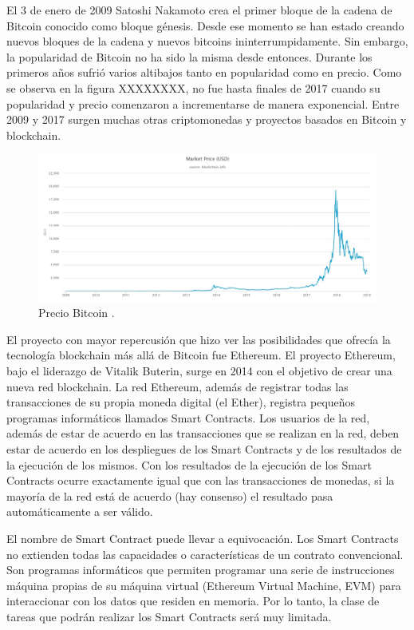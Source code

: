 El 3 de enero de 2009 Satoshi Nakamoto crea el primer bloque de la cadena de Bitcoin conocido como bloque génesis. Desde ese momento se han estado creando nuevos bloques de la cadena y nuevos bitcoins ininterrumpidamente. Sin embargo, la popularidad de Bitcoin no ha sido la misma desde entonces. Durante los primeros años sufrió varios altibajos tanto en popularidad como en precio. Como se observa en la figura XXXXXXXX, no fue hasta finales de 2017 cuando su popularidad y precio comenzaron a incrementarse de manera exponencial. Entre 2009 y 2017 surgen muchas otras criptomonedas y proyectos basados en Bitcoin y blockchain.\newline

\begin{figure}
	\centering
	\includegraphics[width=1\textwidth]{imagenes/market-price-(usd).jpeg}
	\caption{\label{fig1}Precio Bitcoin \cite{blockchaininfo}.}
\end{figure}

El proyecto con mayor repercusión que hizo ver las posibilidades que ofrecía la tecnología blockchain más allá de Bitcoin fue Ethereum. El proyecto Ethereum, bajo el liderazgo de Vitalik Buterin, surge en 2014 con el objetivo de crear una nueva red blockchain. La red Ethereum, además de registrar todas las transacciones de su propia moneda digital (el Ether), registra pequeños programas informáticos llamados Smart Contracts. Los usuarios de la red, además de estar de acuerdo en las transacciones que se realizan en la red, deben estar de acuerdo en los despliegues de los Smart Contracts y de los resultados de la ejecución de los mismos. Con los resultados de la ejecución de los Smart Contracts ocurre exactamente igual que con las transacciones de monedas, si la mayoría de la red está de acuerdo (hay consenso) el resultado pasa automáticamente a ser válido. \newline

El nombre de Smart Contract puede llevar a equivocación. Los Smart Contracts no extienden todas las capacidades o características de un contrato convencional. Son programas informáticos que permiten programar una serie de instrucciones máquina propias de su máquina virtual (Ethereum Virtual Machine, EVM) para interaccionar con los datos que residen en memoria. Por lo tanto, la clase de tareas que podrán realizar los Smart Contracts será muy limitada. \newline

